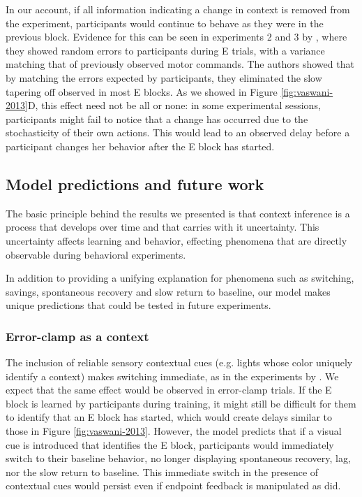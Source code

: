 \documentclass[a4paper,doc,floatsintext,natbib]{apa6}
\def \fref #1{Figure \ref{#1}}     %
\begin{document}
In our account, if all information indicating a change in context is removed from the experiment, participants would continue to behave as they were in the previous block. Evidence for this can be seen in experiments 2 and 3 by \cite{Vaswani_Decay_2013}, where they showed random errors to participants during E trials, with a variance matching that of previously observed motor commands. The authors showed that by matching the errors expected by participants, they eliminated the slow tapering off observed in most E blocks. As we showed in \fref{fig:vaswani-2013}D, this effect need not be all or none: in some experimental sessions, participants might fail to notice that a change has occurred due to the stochasticity of their own actions. This would lead to an observed delay before a participant changes her behavior after the E block has started.


\subsection{Model predictions and future work}
The basic principle behind the results we presented is that context inference is a process that develops over time and that carries with it uncertainty. This uncertainty affects learning and behavior, effecting phenomena that are directly observable during behavioral experiments.

In addition to providing a unifying explanation for phenomena such as switching, savings, spontaneous recovery and slow return to baseline, our model makes unique predictions that could be tested in future experiments.

\subsubsection{Error-clamp as a context}
The inclusion of reliable sensory contextual cues (e.g. lights whose color uniquely identify a context) makes switching immediate, as in the experiments by \cite{Kim_Neural_2015}. We expect that the same effect would be observed in error-clamp trials. If the E block is learned by participants during training, it might still be difficult for them to identify that an E block has started, which would create delays similar to those in \fref{fig:vaswani-2013}. However, the model predicts that if a visual cue is introduced that identifies the E block, participants would immediately switch to their baseline behavior, no longer displaying spontaneous recovery, lag, nor the slow return to baseline. This immediate switch in the presence of contextual cues would persist even if endpoint feedback is manipulated as \cite{Vaswani_Decay_2013} did.
\end{document}

